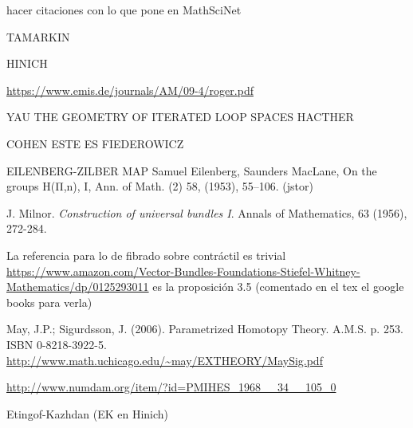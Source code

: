 \documentclass[TFM.tex]{subfiles}
\begin{document}
%


\begin{thebibliography}{}






 hacer citaciones con lo que pone en MathSciNet

 TAMARKIN

 HINICH

 \url{https://www.emis.de/journals/AM/09-4/roger.pdf}





 YAU
 THE GEOMETRY OF ITERATED LOOP SPACES
 HACTHER

 COHEN
 ESTE ES FIEDEROWICZ

 EILENBERG-ZILBER MAP Samuel Eilenberg, Saunders MacLane, On the groups H(Π,n), I, Ann. of Math. (2) 58, (1953), 55–106. (jstor)


 J. Milnor. \emph{Construction of universal bundles I}. Annals of Mathematics, 63 (1956), 272-284. 

 La referencia para lo de fibrado sobre contráctil es trivial \url{https://www.amazon.com/Vector-Bundles-Foundations-Stiefel-Whitney-Mathematics/dp/0125293011} es la proposición 3.5 (comentado en el tex el google books para verla) %

 May, J.P.; Sigurdsson, J. (2006). Parametrized Homotopy Theory. A.M.S. p. 253. ISBN 0-8218-3922-5. \url{http://www.math.uchicago.edu/~may/EXTHEORY/MaySig.pdf}

 \url{http://www.numdam.org/item/?id=PMIHES_1968__34__105_0}




  Etingof-Kazhdan (EK en Hinich)
\end{thebibliography}
\end{document}

